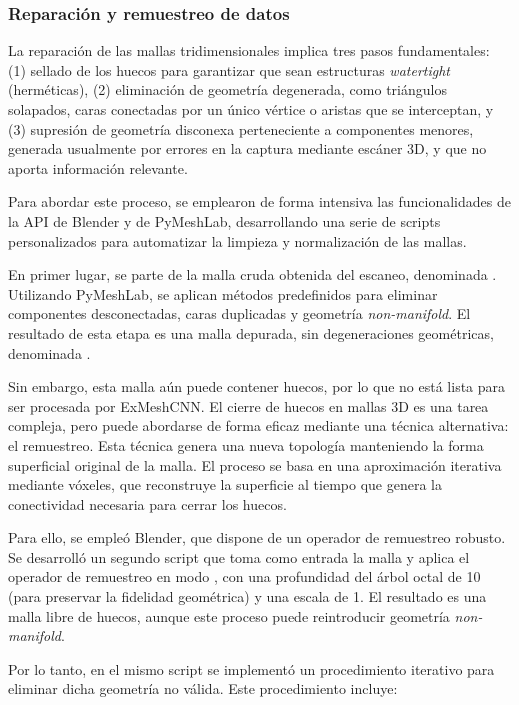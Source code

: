 \subsubsection{Reparación y remuestreo de datos}
\label{section4:data_repair}

La reparación de las mallas tridimensionales implica tres pasos fundamentales: (1) sellado de los huecos para garantizar que sean estructuras \textit{watertight} (herméticas), (2) eliminación de geometría degenerada, como triángulos solapados, caras conectadas por un único vértice o aristas que se interceptan, y (3) supresión de geometría disconexa perteneciente a componentes menores, generada usualmente por errores en la captura mediante escáner 3D, y que no aporta información relevante.

Para abordar este proceso, se emplearon de forma intensiva las funcionalidades de la API de Blender y de PyMeshLab, desarrollando una serie de scripts personalizados para automatizar la limpieza y normalización de las mallas.

En primer lugar, se parte de la malla cruda obtenida del escaneo, denominada . Utilizando PyMeshLab, se aplican métodos predefinidos para eliminar componentes desconectadas, caras duplicadas y geometría \textit{non-manifold}. El resultado de esta etapa es una malla depurada, sin degeneraciones geométricas, denominada .

Sin embargo, esta malla aún puede contener huecos, por lo que no está lista para ser procesada por ExMeshCNN. El cierre de huecos en mallas 3D es una tarea compleja, pero puede abordarse de forma eficaz mediante una técnica alternativa: el remuestreo. Esta técnica genera una nueva topología manteniendo la forma superficial original de la malla. El proceso se basa en una aproximación iterativa mediante vóxeles, que reconstruye la superficie al tiempo que genera la conectividad necesaria para cerrar los huecos.

Para ello, se empleó Blender, que dispone de un operador de remuestreo robusto. Se desarrolló un segundo script que toma como entrada la malla  y aplica el operador de remuestreo en modo , con una profundidad del árbol octal de 10 (para preservar la fidelidad geométrica) y una escala de 1. El resultado es una malla libre de huecos, aunque este proceso puede reintroducir geometría \textit{non-manifold}.

Por lo tanto, en el mismo script se implementó un procedimiento iterativo para eliminar dicha geometría no válida. Este procedimiento incluye:

